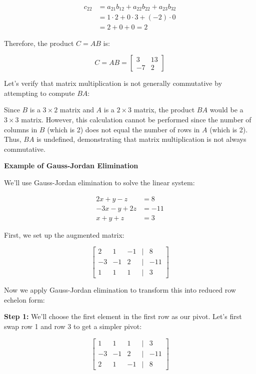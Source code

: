 \begin{align*}
    c_{22} &= a_{21}b_{12} + a_{22}b_{22} + a_{23}b_{32} \\
    &= 1 \cdot 2 + 0 \cdot 3 + (-2) \cdot 0 \\
    &= 2 + 0 + 0 = 2
\end{align*}

Therefore, the product \(C = AB\) is:

\[
    C = AB = 
    \begin{bmatrix}
    3 & 13 \\
    -7 & 2
    \end{bmatrix}
\]

Let's verify that matrix multiplication is not generally commutative by attempting to compute \(BA\):

Since \(B\) is a \(3 \times 2\) matrix and \(A\) is a \(2 \times 3\) matrix, the product \(BA\) would be a \(3 \times 3\) matrix. However, this calculation cannot be performed since the number of columns in \(B\) (which is 2) does not equal the number of rows in \(A\) (which is 2). Thus, \(BA\) is undefined, demonstrating that matrix multiplication is not always commutative.

\textbf{Example of Gauss-Jordan Elimination}

We'll use Gauss-Jordan elimination to solve the linear system:

\begin{align*}
    2x + y - z &= 8 \\
    -3x - y + 2z &= -11 \\
    x + y + z &= 3
\end{align*}

First, we set up the augmented matrix:

\[
    \begin{bmatrix}
    2 & 1 & -1 & | & 8 \\
    -3 & -1 & 2 & | & -11 \\
    1 & 1 & 1 & | & 3
    \end{bmatrix}
\]

Now we apply Gauss-Jordan elimination to transform this into reduced row echelon form:

\textbf{Step 1:} We'll choose the first element in the first row as our pivot. Let's first swap row 1 and row 3 to get a simpler pivot:

\[
    \begin{bmatrix}
    1 & 1 & 1 & | & 3 \\
    -3 & -1 & 2 & | & -11 \\
    2 & 1 & -1 & | & 8
    \end{bmatrix}
\]

